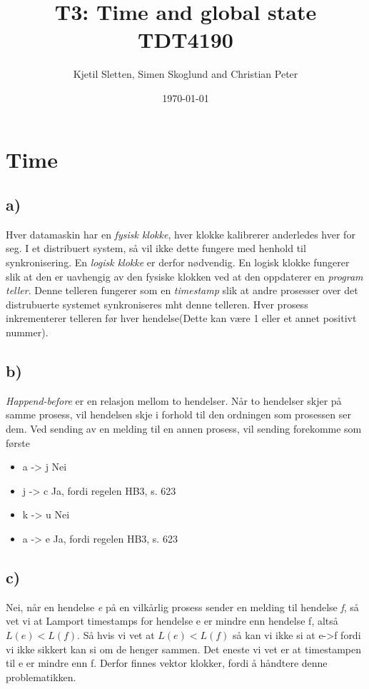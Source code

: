 \documentclass{article}
\begin{document}
\title{T3: Time and global state\\TDT4190}
\author{Kjetil Sletten, Simen Skoglund and Christian Peter}
\date{\today}
\maketitle
\section{Time}
\subsection*{a)}
Hver datamaskin har en \emph{fysisk klokke}, hver klokke kalibrerer anderledes hver for seg. I et distribuert system, så vil ikke dette fungere med henhold til synkronisering. En \emph{logisk klokke} er derfor nødvendig. En logisk klokke fungerer slik at den er uavhengig av den fysiske klokken ved at den oppdaterer en \emph{program teller}. Denne telleren fungerer som en \emph{timestamp} slik at andre prosesser over det distrubuerte systemet synkroniseres mht denne telleren. Hver prosess inkrementerer telleren før hver hendelse(Dette kan være 1 eller et annet positivt nummer).

\subsection*{b)}
\emph{Happend-before} er en relasjon mellom to hendelser. Når to hendelser skjer på samme prosess, vil hendelsen skje i forhold til den ordningen som prosessen ser dem. Ved sending av en melding til en annen prosess, vil sending forekomme som første 
\begin{itemize}
	\item a -> j Nei
	\item j -> c Ja, fordi regelen HB3, s. 623
	\item k -> u Nei
	\item a -> e Ja, fordi regelen HB3, s. 623
\end{itemize}
\subsection*{c)}
Nei, når en hendelse \emph{e} på en vilkårlig prosess sender en melding til hendelse \emph{f}, så vet vi at Lamport timestamps for hendelse e er mindre enn hendelse f, altså $L(e) < L(f)$. Så hvis vi vet at $L(e) < L(f)$ så kan vi ikke si at e->f fordi vi ikke sikkert kan si om de henger sammen. Det eneste vi vet er at timestampen til e er mindre enn f. Derfor finnes vektor klokker, fordi å håndtere denne problematikken. 
\end{document}
